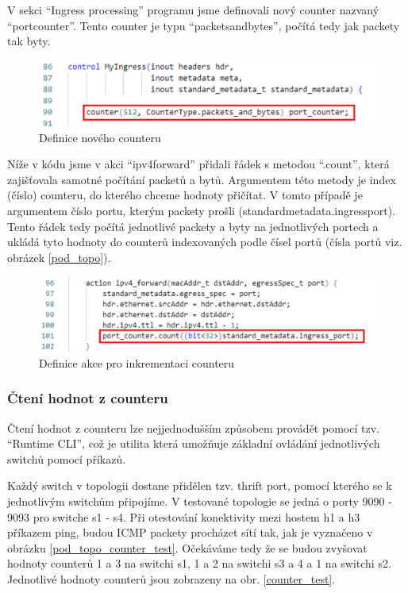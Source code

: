 \documentclass[czech, 11pt]{article}
\begin{document}
    V sekci \enquote{Ingress processing} programu jsme definovali nový counter nazvaný \enquote{port{\textunderscore}counter}. Tento counter je typu \enquote{packets{\textunderscore}and{\textunderscore}bytes}, počítá tedy jak packety tak byty.

    \begin{figure}[H]
		\centering
		\includegraphics[width=.8\textwidth,height=\textheight,keepaspectratio]{port_counter.png}
		\caption{Definice nového counteru}
		\label{obrazek1}
	\end{figure}

    
    Níže v kódu jsme v akci \enquote{ipv4{\textunderscore}forward} přidali řádek s metodou \enquote{.count}, která zajišťovala samotné počítání packetů a bytů. Argumentem této metody je index (číslo) counteru, do kterého chceme hodnoty přičítat. V tomto případě je argumentem číslo portu, kterým packety prošli (standard{\textunderscore}metadata.ingress{\textunderscore}port). Tento řádek tedy počítá jednotlivé packety a byty na jednotlivých portech a ukládá tyto hodnoty do counterů indexovaných podle čísel portů (čísla portů viz. obrázek \ref{pod_topo}). \cite{cornell, dokumentace, bmv2simpleswitch, p4learning}
    \begin{figure}[H]
		\centering
		\includegraphics[width=.8\textwidth,height=\textheight,keepaspectratio]{action.png}
		\caption{Definice akce pro inkrementaci counteru}
		\label{obrazek2}
	\end{figure}

    
    \subsubsection{Čtení hodnot z counteru}
    Čtení hodnot z counteru lze nejjednodušším způsobem provádět pomocí tzv. \enquote{Runtime CLI}, což je utilita která umožňuje základní ovládání jednotlivých switchů pomocí příkazů.

    Každý switch v topologii dostane přidělen tzv. thrift port, pomocí kterého se k jednotlivým switchům připojíme. V testované topologie se jedná o porty 9090 - 9093 pro switche s1 - s4. Při otestování konektivity mezi hostem h1 a h3 příkazem ping, budou ICMP packety procházet sítí tak, jak je vyznačeno v obrázku \ref{pod_topo_counter_test}. Očekáváme tedy že se budou zvyšovat hodnoty counterů 1 a 3 na switchi s1, 1 a 2 na switchi s3 a 4 a 1 na switchi s2. Jednotlivé hodnoty counterů jsou zobrazeny na obr. \ref{counter_test}. \cite{runtimecli,bmv2simpleswitch,cornell}
    
\end{document}
